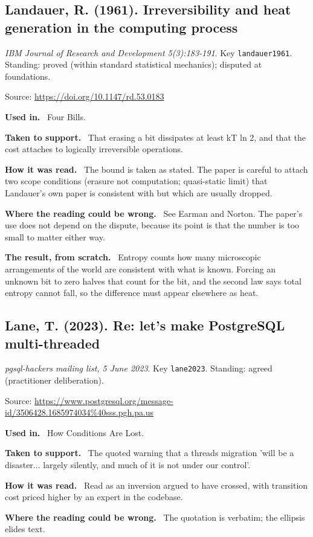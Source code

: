 \documentclass[11pt,oneside]{article}
\newcommand{\field}[1]{\par\noindent\textbf{\color{accent}#1.}\ }
\begin{document}
\hypertarget{src:landauer1961}{}
\subsection*{Landauer, R. (1961). Irreversibility and heat generation in the computing process}
\noindent\small\emph{IBM Journal of Research and Development 5(3):183-191}. Key \texttt{landauer1961}. Standing: proved (within standard statistical mechanics); disputed at foundations.
\par\noindent\small Source: \url{https://doi.org/10.1147/rd.53.0183}
\normalsize
\field{Used in} Four Bills.
\field{Taken to support} That erasing a bit dissipates at least kT ln 2, and that the cost attaches to logically irreversible operations.
\field{How it was read} The bound is taken as stated. The paper is careful to attach two scope conditions (erasure not computation; quasi-static limit) that Landauer's own paper is consistent with but which are usually dropped.
\field{Where the reading could be wrong} See Earman and Norton. The paper's use does not depend on the dispute, because its point is that the number is too small to matter either way.
\field{The result, from scratch} Entropy counts how many microscopic arrangements of the world are consistent with what is known. Forcing an unknown bit to zero halves that count for the bit, and the second law says total entropy cannot fall, so the difference must appear elsewhere as heat.

\hypertarget{src:lane2023}{}
\subsection*{Lane, T. (2023). Re: let's make PostgreSQL multi-threaded}
\noindent\small\emph{pgsql-hackers mailing list, 5 June 2023}. Key \texttt{lane2023}. Standing: agreed (practitioner deliberation).
\par\noindent\small Source: \url{https://www.postgresql.org/message-id/3506428.1685974034%40sss.pgh.pa.us}
\normalsize
\field{Used in} How Conditions Are Lost.
\field{Taken to support} The quoted warning that a threads migration 'will be a disaster... largely silently, and much of it is not under our control'.
\field{How it was read} Read as an inversion argued to have crossed, with transition cost priced higher by an expert in the codebase.
\field{Where the reading could be wrong} The quotation is verbatim; the ellipsis elides text.

\hypertarget{src:lehman1980}{}
\end{document}
